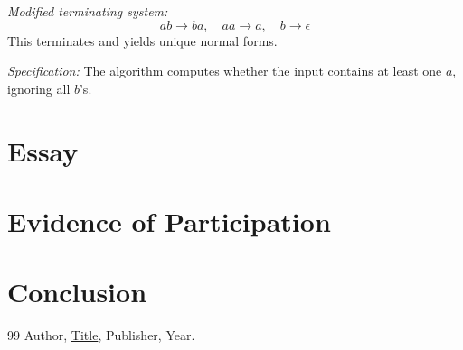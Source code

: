 \documentclass{article}
\theoremstyle{theorem}
\theoremstyle{definition}
\theoremstyle{remark}
\begin{document}
\textit{Modified terminating system:}
\[
ab \to ba, \quad aa \to a, \quad b \to \epsilon
\]
This terminates and yields unique normal forms.  

\textit{Specification:} The algorithm computes whether the input contains at least one $a$, ignoring all $b$’s.


\section{Essay}

\section{Evidence of Participation}

\section{Conclusion}\label{conclusion}

\begin{thebibliography}{99}
 Author, \href{https://en.wikipedia.org/wiki/LaTeX}{Title}, Publisher, Year.
\end{thebibliography}
\end{document}
